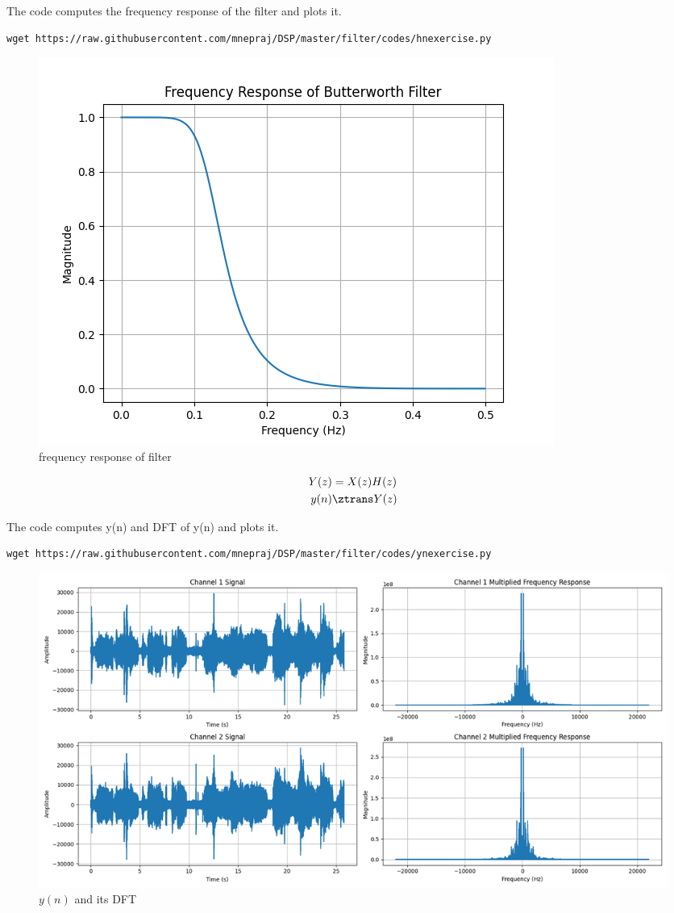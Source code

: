 \documentclass[journal,12pt,twocolumn]{IEEEtran}
\renewcommand\thesection{\arabic{section}}
\begin{document}
\begin{enumerate}[label=\thesection.\arabic*]
	      The code computes the frequency response of the filter and plots it.
	      \begin{lstlisting}
wget https://raw.githubusercontent.com/mnepraj/DSP/master/filter/codes/hnexercise.py
\end{lstlisting}
	      \begin{figure}[h]
		      \centering
		      \includegraphics[width=\columnwidth]{figs/hnexercise.png}
		      \caption{frequency response of filter}
		      \label{fig:hn_exercise}
	      \end{figure}
	      \begin{align}
		      Y(z) & = X(z)H(z)   \\
		      y(n) & \ztrans Y(z)
	      \end{align}

	      The code computes y(n) and DFT of y(n) and plots it.
	      \begin{lstlisting}
wget https://raw.githubusercontent.com/mnepraj/DSP/master/filter/codes/ynexercise.py
\end{lstlisting}
	      \begin{figure}[h]
		      \centering
		      \includegraphics[width=\columnwidth]{figs/ynexercise.png}
		      \caption{$y(n)$ and its DFT}
		      \label{fig:yn_exercise}
	      \end{figure}




\end{enumerate}
\end{document}
